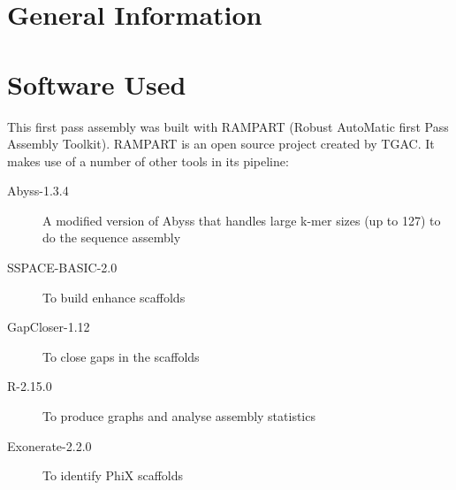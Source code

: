 \documentclass{amsart}
\title{\titleinfo}
\author{$rg_author}
\date{}
\newcommand{\titleinfo}{$rg_title}
\begin{document}
\maketitle
\thispagestyle{fancy}
\tableofcontents


\linespread{1.2} %
\setlength\parindent{0pt} %
\setlength{\parskip}{0.25cm} %
\setlength{\belowbottomsep}{2ex} %



\newpage
\section{General Information}


\section{Software Used}

This first pass assembly was built with RAMPART (Robust AutoMatic first Pass Assembly Toolkit).  RAMPART is an open source project created by TGAC.  It makes use of a number of other tools in its pipeline:

\begin{description}

\item[Abyss-1.3.4] A modified version of Abyss that handles large k-mer sizes (up to 127) to do the sequence assembly
\item[SSPACE-BASIC-2.0] To build enhance scaffolds
\item[GapCloser-1.12] To close gaps in the scaffolds
\item[R-2.15.0] To produce graphs and analyse assembly statistics
\item[Exonerate-2.2.0] To identify PhiX scaffolds
\end{description}
\end{document}
